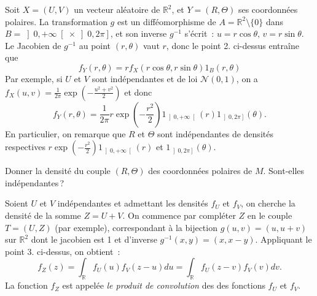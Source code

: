 \begin{exemple}\label{II-polar}

Soit \(X = (U,V)\) un vecteur aléatoire de \(\mathbb{R}^2\), et
\(Y = (R,\Theta)\) ses coordonnées polaires. La transformation \(g\) est
un difféomorphisme de \(A = \mathbb{R}^2\setminus\{0\}\) dans
\(B = \left]0,+\infty\right[\times \left]0,2\pi\right]\), et son inverse
\(g^{-1}\) s'écrit~: \(u = r\cos \theta,\, v= r\sin \theta\). Le
Jacobien de \(g^{-1}\) au point \((r,\theta)\) vaut \(r\), donc le point
2. ci-dessus entraîne que
\[ f_Y(r,\theta) = r f_X(r\cos\theta,r\sin\theta)1_B(r,\theta)\] Par
exemple, si \(U\) et \(V\) sont indépendantes et de loi
\(\mathcal{N}(0,1)\), on a
\(f_X(u,v) = \frac{1}{2\pi}\exp\left(-\frac{u^2+v^2}{2}\right)\) et donc
\[ f_Y(r,\theta) = \frac{1}{2\pi} r\exp\left(-\frac{r^2}{2}\right)1_{\left]0,+\infty\right[ }(r)1_{\left]0,2\pi\right]}(\theta).\]
En particulier, on remarque que \(R\) et \(\Theta\) sont indépendantes
de densités respectives
\(r\exp\left(-\frac{r^2}{2}\right)1_{\left]0,+\infty\right[}(r)\) et
\(1_{\left]0,2\pi\right]}(\theta)\).
\end{exemple}

\label{II-exo-flechetteter}
Donner la densité du couple \((R,\Theta)\) des coordonnées polaires de
\(M\). Sont-elles indépendantes\,?

\begin{exemple}\label{II-sum}

Soient \(U\) et \(V\) indépendantes et admettant les densités \(f_U\) et
\(f_V\), on cherche la densité de la somme \(Z = U+V\). On commence par
compléter \(Z\) en le couple \(T = (U,Z)\) (par exemple), correspondant
à la bijection \(g(u,v) = (u, u+v)\) sur \(\mathbb{R}^2\) dont le
jacobien est 1 et d'inverse \(g^{-1}(x,y) = (x,x-y)\). Appliquant le
point 3. ci-dessus, on obtient~:
\[f_Z(z) = \int_{\mathbb{R}}f_U(u)f_V(z-u) du = \int_{\mathbb{R}}f_U(z-v)f_V(v)dv.\]
La fonction \(f_Z\) est appelée \emph{le produit de convolution} des des
fonctions \(f_U\) et \(f_V\).
\end{exemple}

